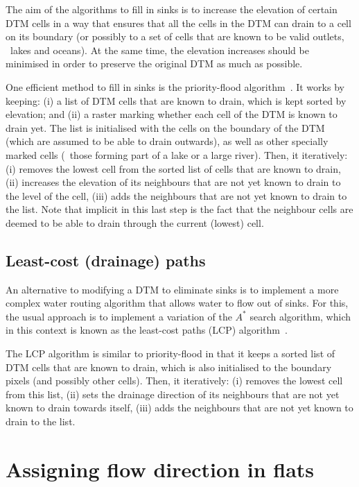 The aim of the algorithms to fill in sinks is to increase the elevation of certain DTM cells in a way that ensures that all the cells in the DTM can drain to a cell on its boundary (or possibly to a set of cells that are known to be valid outlets, \eg\ lakes and oceans)\@.
At the same time, the elevation increases should be minimised in order to preserve the original DTM as much as possible.

One efficient method to fill in sinks is the priority-flood algorithm~\citep{Barnes14a}.
It works by keeping: (i) a list of DTM cells that are known to drain, which is kept sorted by elevation; and (ii) a raster marking whether each cell of the DTM is known to drain yet.
The list is initialised with the cells on the boundary of the DTM (which are assumed to be able to drain outwards), as well as other specially marked cells (\eg\ those forming part of a lake or a large river)\@.
Then, it iteratively: (i) removes the lowest cell from the sorted list of cells that are known to drain, (ii) increases the elevation of its neighbours that are not yet known to drain to the level of the cell, (iii) adds the neighbours that are not yet known to drain to the list.
Note that implicit in this last step is the fact that the neighbour cells are deemed to be able to drain through the current (lowest) cell.

\subsection{Least-cost (drainage) paths}

An alternative to modifying a DTM to eliminate sinks is to implement a more complex water routing algorithm that allows water to flow out of sinks.
For this, the usual approach is to implement a variation of the \(A^{*}\) search algorithm, which in this context is known as the least-cost paths (LCP) algorithm~\citep{Metz11}.

The LCP algorithm is similar to priority-flood in that it keeps a sorted list of DTM cells that are known to drain, which is also initialised to the boundary pixels (and possibly other cells).
Then, it iteratively: (i) removes the lowest cell from this list, (ii) sets the drainage direction of its neighbours that are not yet known to drain towards itself, (iii) adds the neighbours that are not yet known to drain to the list.

\section[Flow direction in flats]{Assigning flow direction in flats}


